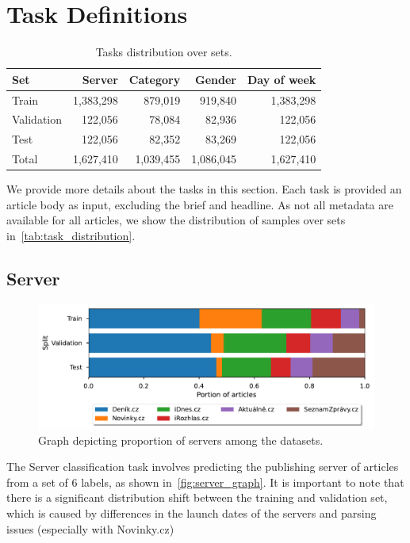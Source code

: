 \section{Task Definitions}\label{sec:task_definition}
\begin{table}[h]
        \caption{Tasks distribution over sets.}
        \label{tab:task_distribution}
        \centering
        \begin{tabular}{lrrrr}
        \toprule
        Set &   Server &  Category &  Gender &  Day of week \\
        \midrule
        Train      &  1,383,298 &             \hphantom{1,}879,019 & \hphantom{1,}919,840 &      1,383,298 \\
        Validation &  \hphantom{1,}122,056 &  \hphantom{1,0}78,084 & \hphantom{1,0}82,936 & \hphantom{1,}122,056 \\
        Test       &  \hphantom{1,}122,056 &  \hphantom{1,0}82,352 & \hphantom{1,0}83,269 & \hphantom{1,}122,056 \\
        \midrule
        Total   &   1,627,410 &  1,039,455 &           1,086,045 &    1,627,410  \\
        \bottomrule
        \end{tabular}
\end{table}
We provide more details about the tasks in this section.
Each task is provided an article body as input, excluding the brief and headline.
As not all metadata are available for all articles, we show the distribution of samples over sets
in~\autoref{tab:task_distribution}.


\subsection{Server}
\label{sec:server-desc}
\begin{figure}[ht]
    \centering
    \includegraphics[width=1.0\textwidth]{img/tasks_graph/server.pdf}
    \caption{Graph depicting proportion of servers among the datasets.}
    \label{fig:server_graph}
\end{figure}
The Server classification task involves predicting the publishing server
of articles from a set of 6 labels, as shown in~\autoref{fig:server_graph}. It is important to note
that there is a significant distribution shift between the training and validation
set, which is caused by differences in the launch dates of the servers and parsing
issues (especially with Novinky.cz)


